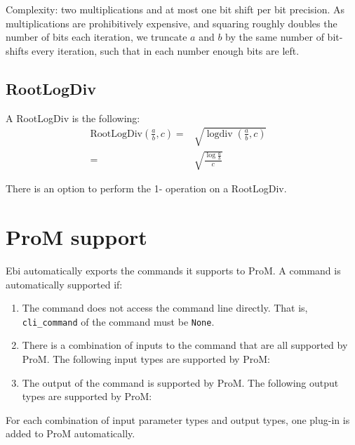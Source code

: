 \documentclass{book}
\DeclareMathOperator{\logdiv}{logdiv}
\begin{document}
\begin{itemize}
                        Complexity: two multiplications and at most one bit shift per bit precision.
                        As multiplications are prohibitively expensive, and squaring roughly doubles the number of bits each iteration, we truncate $a$ and $b$ by the same number of bit-shifts every iteration, such that in each number enough bits are left.
                    \end{itemize}

        \subsection{RootLogDiv}
            A RootLogDiv is the following:
            \begin{align*}
                \text{RootLogDiv}(\frac{a}{b},c) ={}& \sqrt{\logdiv(\frac{a}{b}, c)}\\
                {}={}& \sqrt{\frac{\log\frac{a}{b}}{c}}& 
            \end{align*}

            There is an option to perform the 1- operation on a RootLogDiv.

    \section{ProM support}
        Ebi automatically exports the commands it supports to ProM.
        A command is automatically supported if:
        \begin{enumerate}
            \item The command does not access the command line directly.
            That is, \verb=cli_command= of the command must be \verb=None=.
            \item There is a combination of inputs to the command that are all supported by ProM.
            The following input types are supported by ProM:
            \ebiprominput
            
            \item The output of the command is supported by ProM.
            The following output types are supported by ProM:
            \ebipromoutput
        \end{enumerate}
        For each combination of input parameter types and output types, one plug-in is added to ProM automatically.
            
    
    

    \printindex
\end{document}
